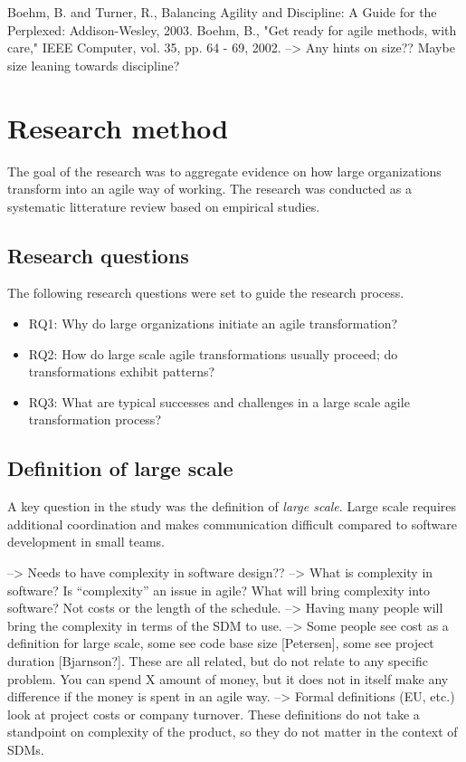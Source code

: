 \documentclass[preprint,authoryear,12pt]{elsarticle}
\begin{document}
Boehm, B. and Turner, R., Balancing Agility and Discipline: A Guide for the
Perplexed: Addison-Wesley, 2003.
Boehm, B., "Get ready for agile methods, with care," IEEE Computer, vol. 35,
pp. 64 - 69, 2002.
--> Any hints on size?? Maybe size leaning towards discipline?


\section{Research method}
\label{sec:method}

The goal of the research was to aggregate evidence on how large organizations
transform into an agile way of working. The research was conducted as a
systematic litterature review based on empirical studies.

\subsection{Research questions}

The following research questions were set to guide the research process.

\begin{itemize}

\item
RQ1: Why do large organizations initiate an agile transformation?

\item
RQ2: How do large scale agile transformations usually proceed; do
     transformations exhibit patterns?

\item
RQ3: What are typical successes and challenges in a large scale agile
     transformation process?

\end{itemize}


\subsection{Definition of large scale}
\label{sec:largescale}

A key question in the study was the definition of \emph{large scale}. Large
scale requires additional coordination and makes communication difficult
compared to software development in small teams.

--> Needs to have complexity in software design?? --> What is complexity in software?
    Is ``complexity'' an issue in agile?
    What will bring complexity into software? Not costs or the length of the
    schedule. --> Having many people will bring the complexity in terms of the
    SDM to use.
--> Some people see cost as a definition for large scale, some see code base
    size [Petersen], some see project duration [Bjarnson?]. These are all
    related, but do not relate to any specific problem. You can spend X amount
    of money, but it does not in itself make any difference if the money is
    spent in an agile way.
--> Formal definitions (EU, etc.) look at project costs or company turnover.
    These definitions do not take a standpoint on complexity of the product, so
    they do not matter in the context of SDMs.
\end{document}

